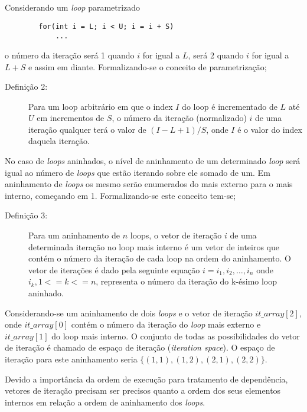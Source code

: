 Considerando um \textit{loop} parametrizado

\begin{verbatim}
        for(int i = L; i < U; i = i + S)
            ...
\end{verbatim}

o número da iteração será 1 quando $i$ for igual a $L$, será 2 quando $i$ for
igual a $L+S$ e assim em diante. 
Formalizando-se o conceito de parametrização;

\begin{description}
        \item [Definição 2:] Para um loop arbitrário em que o index $I$ do loop é
        incrementado de $L$ até $U$ em incrementos de $S$, o número da iteração
        (normalizado) $i$ de uma iteração qualquer terá o valor de 
        $(I - L + 1)/ S$, onde $I$ é o valor do index daquela iteração.
\end{description}

No caso de \textit{loops} aninhados, o nível de aninhamento de um determinado 
\textit{loop} será igual ao número de \textit{loops} que estão iterando sobre
ele somado de um. Em aninhamento de \textit{loops} os mesmo serão enumerados do
mais externo para o mais interno, começando em 1. Formalizando-se este conceito
tem-se;

\begin{description}
        \item[Definição 3:] Para um aninhamento de $n$ loops, o vetor de
                iteração $i$ de uma determinada iteração no loop mais interno 
                é um vetor de inteiros que contém o número da iteração de cada 
                loop na ordem do aninhamento. 
                O vetor de iterações é dado pela seguinte equação
                $i = {i_1, i_2, \ldots, i_n}$
                onde $i_k, 1 <= k <= n$, representa o número da iteração do 
                k-ésimo loop aninhado.
\end{description}

Considerando-se um aninhamento de dois \textit{loops} e o vetor de iteração
$it\_array[2]$, onde $it\_array[0]$ contém o número da iteração do \textit{loop}
mais externo e $it\_array[1]$ do loop mais interno. 
O conjunto de todas as possibilidades do vetor de iteração é chamado de espaço 
de iteração (\textit{iteration space}). 
O espaço de iteração para este aninhamento seria $\{(1,1),(1,2),(2,1),(2,2)\}$.

Devido a importância da ordem de execução para tratamento de dependência,
vetores de iteração precisam ser precisos quanto a ordem dos seus elementos
internos em relação a ordem de aninhamento dos \textit{loops}. 










